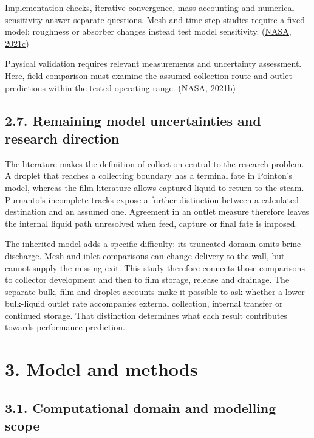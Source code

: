\documentclass[
  12pt,
  a4paper,
]{article}
\begin{document}
Implementation checks, iterative convergence, mass accounting and
numerical sensitivity answer separate questions. Mesh and time-step
studies require a fixed model; roughness or absorber changes instead
test model sensitivity.
(\href{https://www.grc.nasa.gov/www/wind/valid/tutorial/verassess.html}{NASA,
2021c})

Physical validation requires relevant measurements and uncertainty
assessment. Here, field comparison must examine the assumed collection
route and outlet predictions within the tested operating range.
(\href{https://www.grc.nasa.gov/www/wind/valid/tutorial/valassess.html}{NASA,
2021b})

\subsection{2.7. Remaining model uncertainties and research
direction}\label{remaining-model-uncertainties-and-research-direction}

The literature makes the definition of collection central to the
research problem. A droplet that reaches a collecting boundary has a
terminal fate in Pointon's model, whereas the film literature allows
captured liquid to return to the steam. Purnanto's incomplete tracks
expose a further distinction between a calculated destination and an
assumed one. Agreement in an outlet measure therefore leaves the
internal liquid path unresolved when feed, capture or final fate is
imposed.

The inherited model adds a specific difficulty: its truncated domain
omits brine discharge. Mesh and inlet comparisons can change delivery to
the wall, but cannot supply the missing exit. This study therefore
connects those comparisons to collector development and then to film
storage, release and drainage. The separate bulk, film and droplet
accounts make it possible to ask whether a lower bulk-liquid outlet rate
accompanies external collection, internal transfer or continued storage.
That distinction determines what each result contributes towards
performance prediction.

\section{3. Model and methods}\label{model-and-methods}

\subsection{3.1. Computational domain and modelling
scope}\label{computational-domain-and-modelling-scope}
\end{document}
